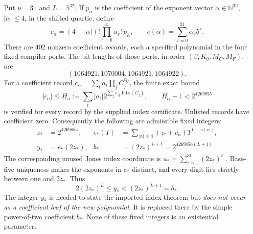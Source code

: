 Put \(\nu=31\) and \(L=5^{32}\).  If \(p_\alpha\) is the coefficient
of the exponent vector \(\alpha\in\mathbb N^{32}\), \(|\alpha|\le4\),
in the shifted quartic, define
\[
 c_\alpha=(4-|\alpha|)!\prod_{r=0}^{31}\alpha_r!\,p_\alpha,
 \qquad e(\alpha)=\sum_{r=0}^{31}\alpha_r5^r.
\]
There are 402 nonzero coefficient records, each a specified polynomial in
the four fixed compiler ports.  The bit lengths of those ports, in order
\((\beta,K_0,M_C,M_F)\), are
\[
 (1064921,1070004,1064921,1064922).
\]
For a coefficient record \(c_\alpha=\sum_t a_t\prod_j C_j^{e_{tj}}\),
the finite exact bound
\[
 |c_\alpha|\le H_\alpha
 :=\sum_t|a_t|2^{\sum_j e_{tj}\operatorname{bits}(C_j)},
 \qquad H_\alpha+1<2^{4269855}
\]
is verified for every record by the supplied index certificate.  Unlisted
records have coefficient zero.  Consequently the following are admissible
fixed integers:
\begin{align*}
 z_*&=2^{4269855}, &
 e_*(T)&=\sum_{|\alpha|\le4}(z_*+c_\alpha)
                          T^{L-e(\alpha)},\\
 y_*&=e_*(2z_*),&
 b_*&=(2z_*)^{L+1}=2^{4269856(L+1)}.
\end{align*}
The corresponding unused Jones index coordinate is
\(u_*=\sum_{r=1}^{31}(2z_*)^{5^r}\).  Base-five uniqueness makes the
exponents in \(e_*\) distinct, and every digit lies strictly between one
and \(2z_*\).  Thus
\[
 2(2z_*)^L\le y_*<(2z_*)^{L+1}=b_*.
\]
The integer \(y_*\) is needed to state the imported index theorem but
\emph{does not occur as a coefficient leaf of the new polynomial}.
It is replaced there by the simple power-of-two coefficient \(b_*\).
None of these fixed integers is an existential parameter.

